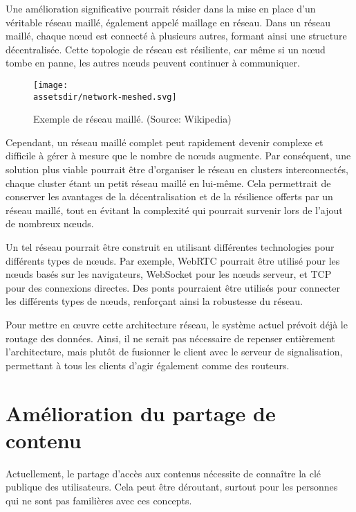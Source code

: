 Une amélioration significative pourrait résider dans la mise en place d'un véritable réseau maillé, également appelé maillage en réseau. Dans un réseau maillé, chaque n\oe{}ud est connecté à plusieurs autres, formant ainsi une structure décentralisée. Cette topologie de réseau est résiliente, car même si un n\oe{}ud tombe en panne, les autres n\oe{}uds peuvent continuer à communiquer.

\begin{wrapfigure}{l}{0.30\textwidth}
    \centering
    \texttt{[image: \\assetsdir/network-meshed.svg]}
    \caption{Exemple de réseau maillé. (Source: Wikipedia\cite{TopologieMesh2023})}
    \label{fig:network-meshed}
\end{wrapfigure}

Cependant, un réseau maillé complet peut rapidement devenir complexe et difficile à gérer à mesure que le nombre de n\oe{}uds augmente. Par conséquent, une solution plus viable pourrait être d'organiser le réseau en clusters interconnectés, chaque cluster étant un petit réseau maillé en lui-même. Cela permettrait de conserver les avantages de la décentralisation et de la résilience offerts par un réseau maillé, tout en évitant la complexité qui pourrait survenir lors de l'ajout de nombreux n\oe{}uds.

Un tel réseau pourrait être construit en utilisant différentes technologies pour différents types de n\oe{}uds. Par exemple, \gls{WebRTC} pourrait être utilisé pour les n\oe{}uds basés sur les navigateurs, \gls{WebSocket} pour les n\oe{}uds serveur, et \gls{TCP} pour des connexions directes. Des ponts pourraient être utilisés pour connecter les différents types de n\oe{}uds, renforçant ainsi la robustesse du réseau.

Pour mettre en \oe{}uvre cette architecture réseau, le système actuel prévoit déjà le routage des données. Ainsi, il ne serait pas nécessaire de repenser entièrement l'architecture, mais plutôt de fusionner le client avec le serveur de signalisation, permettant à tous les clients d'agir également comme des routeurs.

\section{Amélioration du partage de contenu}

Actuellement, le partage d'accès aux contenus nécessite de connaître la clé publique des utilisateurs. Cela peut être déroutant, surtout pour les personnes qui ne sont pas familières avec ces concepts.

